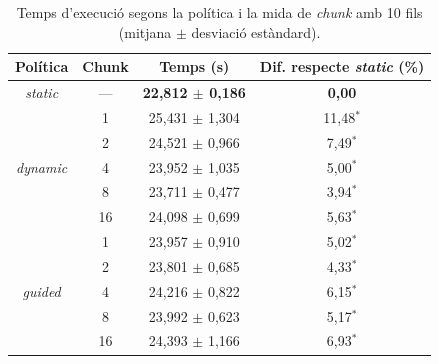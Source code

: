 \begin{table}[H]
\centering
\begin{tabular}{|c|c|c|c|}
\hline
\textbf{Política} & \textbf{Chunk} & \textbf{Temps (s)} & \textbf{Dif. respecte \textit{static} (\%)} \\ \hline
\multirow{1}{*}{\textit{static}} & --- & \textbf{22,812 $\pm$ 0,186} & \textbf{0,00} \\ \hline
\multirow{5}{*}{\textit{dynamic}} & 1 & 25,431 $\pm$ 1,304 & 11,48$^{*}$ \\ \cline{2-4}
 & 2 & 24,521 $\pm$ 0,966 & 7,49$^{*}$ \\ \cline{2-4}
 & 4 & 23,952 $\pm$ 1,035 & 5,00$^{*}$ \\ \cline{2-4}
 & 8 & 23,711 $\pm$ 0,477 & 3,94$^{*}$ \\ \cline{2-4}
 & 16 & 24,098 $\pm$ 0,699 & 5,63$^{*}$ \\ \hline
\multirow{5}{*}{\textit{guided}} & 1 & 23,957 $\pm$ 0,910 & 5,02$^{*}$ \\ \cline{2-4}
 & 2 & 23,801 $\pm$ 0,685 & 4,33$^{*}$ \\ \cline{2-4}
 & 4 & 24,216 $\pm$ 0,822 & 6,15$^{*}$ \\ \cline{2-4}
 & 8 & 23,992 $\pm$ 0,623 & 5,17$^{*}$ \\ \cline{2-4}
 & 16 & 24,393 $\pm$ 1,166 & 6,93$^{*}$ \\ \hline
\end{tabular}
\par{}
\caption{Temps d'execució segons la política i la mida de \textit{chunk} amb 10 fils (mitjana $\pm$ desviació estàndard).}
\label{tab:politiques}
\end{table}
